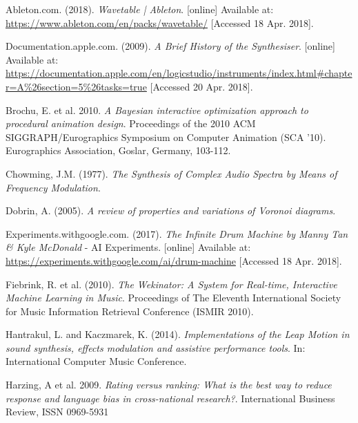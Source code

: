 \documentclass[11pt, oneside]{report}   	%
\begin{document}

\begin{thebibliography}{9}
\singlespacing

Ableton.com. (2018). \emph{Wavetable | Ableton}. [online] Available at: \url{https://www.ableton.com/en/packs/wavetable/} [Accessed 18 Apr. 2018].

Documentation.apple.com. (2009). \emph{A Brief History of the Synthesiser}. [online] Available at: \url{https://documentation.apple.com/en/logicstudio/instruments/index.html#chapter=A\%26section=5\%26tasks=true} [Accessed 20 Apr. 2018].

Brochu, E. et al. 2010. \emph{A Bayesian interactive optimization approach to procedural animation design}. Proceedings of the 2010 ACM SIGGRAPH/Eurographics Symposium on Computer Animation (SCA '10). Eurographics Association, Goslar, Germany, 103-112.

Chowming, J.M. (1977). \emph{The Synthesis of Complex Audio Spectra by Means of Frequency Modulation}.

Dobrin, A. (2005). \emph{A review of properties and variations of Voronoi diagrams}. 


Experiments.withgoogle.com. (2017). \emph{The Infinite Drum Machine by Manny Tan \& Kyle McDonald} - AI Experiments. [online] Available at: \url{https://experiments.withgoogle.com/ai/drum-machine} [Accessed 18 Apr. 2018].

Fiebrink, R. et al. (2010). \emph{The Wekinator: A System for Real-time, Interactive Machine Learning in Music}. Proceedings of The Eleventh International Society for Music Information Retrieval Conference (ISMIR 2010). 

Hantrakul, L. and Kaczmarek, K. (2014). \emph{Implementations of the Leap Motion in sound synthesis, effects modulation and assistive performance tools}. In: International Computer Music Conference. 

Harzing, A et al. 2009. \emph{Rating versus ranking: What is the best way to reduce response and language bias in cross-national research?}.
International Business Review,
ISSN 0969-5931


\end{thebibliography}
\end{document}
